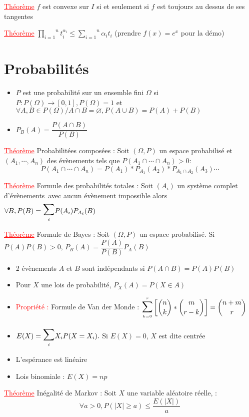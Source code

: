 \documentclass[a4paper, french]{article}
\newcommand{\sce}{système complet d'évènements}
\newcommand{\al}{\alpha}
\newcommand{\Om}{\Omega}
\newcommand{\som}[2]{\overset{#2}{\underset{#1}{\sum}}}
\newcommand{\produit}[2]{\overset{#2}{\underset{#1}{\prod}}}
\newcommand{\thm}{\textcolor{red}{\underline{Théorème} }}
\newcommand{\ppt}{\textcolor{red}{Propriété : }}
\newcommand{\ssum}[2]{\vcenter{\hbox{\scaleto[4ex]{\displaystyle\sum_{\scriptscriptstyle #1}^{\scriptscriptstyle #2}}{7ex}}}}
\begin{document}
	  \thm $f$ est convexe sur $I$ si et seulement si $f$ est toujours au dessus de ses tangentes 
	 
	  \thm $\produit{i=1}{n}t_i^{\al_i} \leqslant \som{i=1}{n}\al_it_i$ (prendre $f(x)=e^x$ pour la démo)
	 
	 
	  \section{Probabilités}

	 \begin{itemize}[label=\(\bullet\)]
		\item $P$ est une probabilité sur un ensemble fini $\Om$ si $P : P(\Om)\rightarrow [0,1], P(\Om)=1$ et $\forall A,B \in P(\Om)/A\cap B =\varnothing, P(A\cup B)=P(A)+P(B)$
		\item $P_B(A)=\dfrac{P(A\cap B)}{P(B)}$
	 \end{itemize}

	 \thm Probabilitées composées : Soit $(\Om,P)$ un espace probabilisé et \((A_1,\cdots,A_n)\) des évènements tels que \(P(A_1\cap\cdots\cap A_n)>0\):
	  \[P(A_1\cap\cdots\cap A_n)=P(A_1)*P_{A_1}(A_2)*P_{A_1\cap A_2}(A_3)\cdots\]
	 
	 \thm Formule des probabilités totales : Soit $(A_i)$ un \sce \, avec aucun évènement impossible alors $\forall B, P(B)=\ssum{i}{}P(A_i)P_{A_i}(B)$ 
	 
	 \thm Formule de Bayes : Soit $(\Om,P)$ un espace probabilisé. Si ${P(A)P(B)>0,} \, {P_B(A)=\dfrac{P(A)}{P(B)}P_A(B)}$
	 
	  \begin{itemize}[label=\(\bullet\)]
		\item 2 évènements $A$ et $B$ sont indépendants si $P(A\cap B)=P(A)P(B)$
		\item Pour $X$ une lois de probabilité, $P_X(A)=P(X\in A)$
		\item \ppt Formule de Van der Monde : $\ssum{k=0}{r} \left[\dbinom{n}{k}*\dbinom{m}{r-k}\right]=\dbinom{n+m}{r}$
		\item $E(X)=\ssum{i}{}X_i P(X=X_i).$ Si $E(X)=0$, $X$ est dite centrée
		\item L'espérance est linéaire
		\item Lois binomiale : $E(X)=np$
	 \end{itemize}
	
	 \thm Inégalité de Markov : Soit $X$ une variable aléatoire réelle,  :
	 	\[\forall a>0, {P(|X|\geqslant a)\leqslant \frac{E(|X|)}{a}}\]
	 
\end{document}
